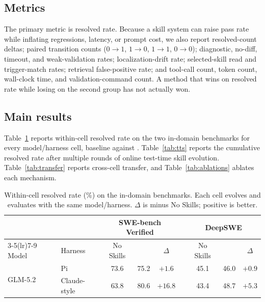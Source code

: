 \subsection{Metrics}

The primary metric is resolved rate. Because a skill system can raise pass rate
while inflating regressions, latency, or prompt cost, we also report
resolved-count deltas; paired transition counts ($0{\rightarrow}1$,
$1{\rightarrow}0$, $1{\rightarrow}1$, $0{\rightarrow}0$); diagnostic, no-diff,
timeout, and weak-validation rates; localization-drift rate; selected-skill read
and trigger-match rates; retrieval false-positive rate; and tool-call count,
token count, wall-clock time, and validation-command count. A method that wins on
resolved rate while losing on the second group has not actually won.

\subsection{Main results}

Table~\ref{tab:main-results} reports within-cell resolved rate on the two
in-domain benchmarks for every model/harness cell, baseline against \method{}.
Table~\ref{tab:tts} reports the cumulative resolved rate after multiple rounds
of online test-time skill evolution.
Table~\ref{tab:transfer} reports cross-cell transfer, and
Table~\ref{tab:ablations} ablates each mechanism.

\begin{table}[t]
\caption{Within-cell resolved rate (\%) on the in-domain benchmarks. Each cell
evolves and evaluates with the same model/harness. $\Delta$ is \method{} minus
No Skills; positive is better.}
\label{tab:main-results}
\begin{center}
\small
\begin{tabular}{@{}l l ccc c ccc@{}}
\toprule
& & \multicolumn{3}{c}{SWE-bench Verified} & & \multicolumn{3}{c}{DeepSWE} \\
\cmidrule(lr){3-5}\cmidrule(lr){7-9}
Model & Harness & No Skills & \method{} & $\Delta$ & & No Skills & \method{} & $\Delta$ \\
\midrule
\multirow{2}{*}{GLM-5.2} & Pi             & 73.6 & 75.2 & $+1.6$ & & 45.1 & 46.0 & $+0.9$ \\
                         & Claude-style   & 63.8 & 80.6 & $+16.8$ & & 43.4 & 48.7 & $+5.3$ \\
\bottomrule
\end{tabular}
\end{center}
\end{table}

